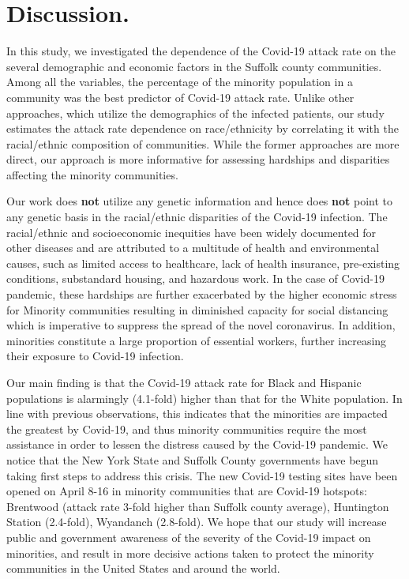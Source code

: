 \documentclass[twoside,12pt,onecolumn]{article}
\begin{document}
\section{Discussion.}
In this study, we investigated the dependence of the Covid-19 attack rate on the several demographic and economic factors in the Suffolk county communities. Among all the variables, the percentage of the minority population in a community was the best predictor of Covid-19 attack rate. Unlike other approaches, which utilize the demographics of the infected patients, our study estimates the attack rate dependence on race/ethnicity by correlating it with the racial/ethnic composition of communities. While the former approaches are more direct, our approach is more informative for assessing hardships and disparities affecting the minority communities.

Our work does \textbf{not} utilize any genetic information and hence does \textbf{not} point to any genetic basis in the racial/ethnic disparities of the Covid-19 infection. The racial/ethnic and socioeconomic inequities have been widely documented for other diseases and are attributed to a multitude of health and environmental causes, such as limited access to healthcare, lack of health insurance, pre-existing conditions, substandard housing, and hazardous work. In the case of Covid-19 pandemic, these hardships are further exacerbated by the higher economic stress for Minority communities resulting in diminished capacity for social distancing which is imperative to suppress the spread of the novel coronavirus. In addition, minorities constitute a large proportion of essential workers, further increasing their exposure to Covid-19 infection.

Our main finding is that the Covid-19 attack rate for Black and Hispanic populations is alarmingly (4.1-fold) higher than that for the White population. In line with previous observations, this indicates that the minorities are impacted the greatest by Covid-19, and thus minority communities require the most assistance in order to lessen the distress caused by the Covid-19 pandemic. We notice that the New York State and Suffolk County governments have begun taking first steps to address this crisis. The new Covid-19 testing sites have been opened on April 8-16  in minority communities that are Covid-19 hotspots: Brentwood (attack rate 3-fold higher than Suffolk county average), Huntington Station (2.4-fold), Wyandanch (2.8-fold). We hope that our study will increase public and government awareness of the severity of the Covid-19 impact on minorities, and result in more decisive actions taken to protect the minority communities in the United States and around the world.
\end{document}
